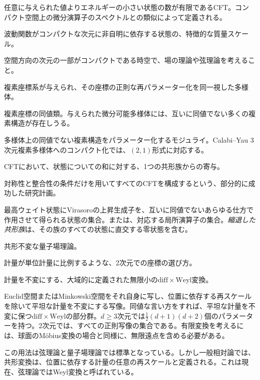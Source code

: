 {任意に与えられた値よりエネルギーの小さい状態の数が有限であるCFT。コンパクト空間上の微分演算子のスペクトルとの類似によって定義される。}

{波動関数がコンパクトな次元に非自明に依存する状態の、特徴的な質量スケール。}

{空間方向の次元の一部がコンパクトである時空で、場の理論や弦理論を考えること。}

{複素座標系が与えられ、その座標の正則な再パラメーター化を同一視した多様体。}

{複素座標の同値類。与えられた微分可能多様体には、互いに同値でない多くの複素構造が存在しうる。}

{多様体上の同値でない複素構造をパラメーター化するモジュライ。Calabi--Yau 3次元複素多様体へのコンパクト化では、$(2,1)$形式に対応する。}

{CFTにおいて、状態についての和に対する、1つの共形族からの寄与。}

{対称性と整合性の条件だけを用いてすべてのCFTを構成するという、部分的に成功した研究計画。}

{最高ウェイト状態にVirasoroの上昇生成子を、互いに同値でないあらゆる仕方で作用させて得られる状態の集合。または、対応する局所演算子の集合。\emph{縮退した共形族}は、その族のすべての状態に直交する零状態を含む。}

{共形不変な量子場理論。}

{計量が単位計量に比例するような、2次元での座標の選び方。}

{計量を不変にする、大域的に定義された無限小の$\mathrm{diff}\times\mathrm{Weyl}$変換。}

{Euclid空間またはMinkowski空間をそれ自身に写し、位置に依存する再スケールを除いて平坦な計量を不変にする写像。同値な言い方をすれば、平坦な計量を不変に保つ$\mathrm{diff}\times\mathrm{Weyl}$の部分群。$d\geq3$次元では$\frac12(d+1)(d+2)$個のパラメーターを持つ。2次元では、すべての正則写像の集合である。有限変換を考えるには、球面のMöbius変換の場合と同様に、無限遠点を含める必要がある。

この用法は弦理論と量子場理論では標準となっている。しかし一般相対論では、共形変換は、位置に依存する計量の任意の再スケールと定義される。これは現在、弦理論ではWeyl変換と呼ばれている。}

